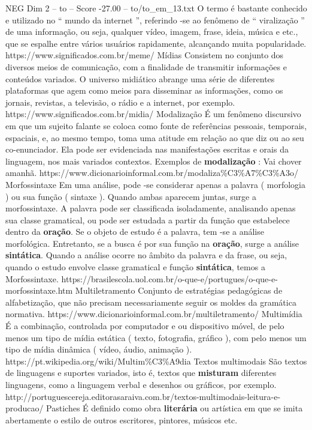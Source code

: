 \begin{textsample}{NEG Dim 2 – to – Score -27.00 – to/to\_em\_13.txt}
O termo é bastante conhecido e utilizado no “ mundo da internet ”, referindo -se ao fenômeno de “ viralização ” de uma informação, ou seja, qualquer vídeo, imagem, frase, ideia, música e etc., que se espalhe entre vários usuários rapidamente, alcançando muita popularidade. https://www.significados.com.br/meme/ Mídias Consistem no conjunto dos diversos meios de comunicação, com a finalidade de transmitir informações e conteúdos variados.
O universo midiático abrange uma série de diferentes plataformas que agem como meios para disseminar as informações, como os jornais, revistas, a televisão, o rádio e a internet, por exemplo. https://www.significados.com.br/midia/ Modalização É um fenômeno discursivo em que um sujeito falante se coloca como fonte de referências pessoais, temporais, espaciais, e, ao mesmo tempo, toma uma atitude em relação ao que diz ou ao seu co-enunciador.
Ela pode ser evidenciada nas manifestações escritas e orais da linguagem, nos mais variados contextos.
Exemplos de \textbf{modalização} : Vai chover amanhã. https://www.dicionarioinformal.com.br/modaliza\%C3\%A7\%C3\%A3o/ Morfossintaxe Em uma análise, pode -se considerar apenas a palavra ( morfologia ) ou sua função ( sintaxe ).
Quando ambas aparecem juntas, surge a morfossintaxe.
A palavra pode ser classificada isoladamente, analisando apenas sua classe gramatical, ou pode ser estudada a partir da função que estabelece dentro da \textbf{oração}.
Se o objeto de estudo é a palavra, tem -se a análise morfológica.
Entretanto, se a busca é por sua função na \textbf{oração}, surge a análise \textbf{sintática}.
Quando a análise ocorre no âmbito da palavra e da frase, ou seja, quando o estudo envolve classe gramatical e função \textbf{sintática}, temos a Morfossintaxe. https://brasilescola.uol.com.br/o-que-e/portugues/o-que-e-morfossintaxe.htm Multiletramento Conjunto de estratégias pedagógicas de alfabetização, que não precisam necessariamente seguir os moldes da gramática normativa. https://www.dicionarioinformal.com.br/multiletramento/ Multimídia É a combinação, controlada por computador e ou dispositivo móvel, de pelo menos um tipo de mídia estática ( texto, fotografia, gráfico ), com pelo menos um tipo de mídia dinâmica ( vídeo, áudio, animação ). https://pt.wikipedia.org/wiki/Multim\%C3\%A9dia Textos multimodais São textos de linguagens e suportes variados, isto é, textos que \textbf{misturam} diferentes linguagens, como a linguagem verbal e desenhos ou gráficos, por exemplo. http://portuguescereja.editorasaraiva.com.br/textos-multimodais-leitura-e-producao/ Pastiches É definido como obra \textbf{literária} ou artística em que se imita abertamente o estilo de outros escritores, pintores, músicos etc.

\end{textsample}
